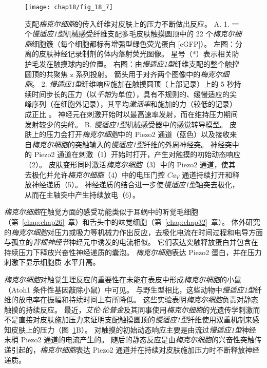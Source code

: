 \begin{figure}[htbp]
	\centering
	\texttt{[image: chap18/fig\_18\_7]}
	\caption{支配\textit{梅克尔细胞}的传入纤维对皮肤上的压力不断做出反应。
		A. 1. 一个\textit{慢适应1型}机械感受纤维支配多毛皮肤触摸圆顶中的 22 个\textit{梅克尔细胞}细胞簇（每个细胞都标有增强型绿色荧光蛋白 [eGFP]）。
		左图：分离的皮肤神经记录制剂的体内落射荧光图像。
		星号（*）表示相关防护毛发在触摸球内的位置。
		右图：由\textit{慢适应1型}纤维支配的整个触控圆顶的共聚焦 z 系列投射。
		箭头用于对齐两个图像中的\textit{梅克尔细胞}。
		2. \textit{慢适应1型}纤维响应施加在触摸圆顶（上部记录）上的 5 秒持续时间步长的压力（以\textit{千帕}为单位），具有不规则的、缓慢适应的尖峰序列（在细胞外记录），其平均\textit{激活率}和施加的力（较低的记录）成正比 。
		神经元在刺激开始时以最高速率发射，而在维持压力期间发射较少的尖峰。
		B. \textit{慢适应1型}机械感受器中的感觉转导模型。
		皮肤上的压力会打开\textit{梅克尔细胞}中的 Piezo2 通道（蓝色）以及接收来自\textit{梅克尔细胞}的突触输入的\textit{慢适应1型}纤维的外周神经突。
		神经突中的 Piezo2 通道在刺激（1）开始时打开，产生对触摸的初始动态响应（2）。
		皮肤变形同时激活\textit{梅克尔细胞}（3）中的 Piezo2 通道，使其去极化并允许\textit{梅克尔细胞}（4）中的电压门控 $Ca_V$ 通道持续打开和释放神经递质（5）。
		神经递质的结合进一步使\textit{慢适应1型}轴突去极化，从而在主轴突中产生持续放电（6）\cite{maksimovic2014epidermal}。}
	\label{fig:18_7}
\end{figure}


\textit{梅克尔细胞}在触觉方面的感受功能类似于耳蜗中的听觉毛细胞（第~\ref{chap:chap26}~章）和舌头中的味觉细胞（第~\ref{chap:chap32}~章）。
体外研究的\textit{梅克尔细胞}对压力或吸力等机械力作出反应，去极化电流在时间过程和电导方面与孤立的\textit{背根神经节}神经元中诱发的电流相似。
它们表达突触释放蛋白并包含在持续压力下释放兴奋性神经递质的囊泡。
\textit{梅克尔细胞}表达 Piezo2 蛋白，并在压力刺激下显示细胞质  水平升高。


\textit{梅克尔细胞}对触觉生理反应的重要性在未能在表皮中形成\textit{梅克尔细胞}的小鼠（Atoh1 条件性基因敲除小鼠）中可见。
与野生型相比，这些动物中\textit{慢适应1型}纤维的放电率在振幅和持续时间上有所降低。
这些实验表明\textit{梅克尔细胞}负责对静态触摸的持续反应。 
最近，\textit{艾伦$\cdot$伦普金}及其同事使用\textit{梅克尔细胞}的光遗传学刺激而不是直接对皮肤施加压力来证明支配触摸圆顶的\textit{慢适应1型}纤维使用双重机制来感知皮肤上的压力（图~\ref{fig:18_7}B）。
对触摸的初始动态响应主要是由流过\textit{慢适应1型}神经末梢 Piezo2 通道的电流产生的。
随后的静态反应是由\textit{梅克尔细胞}的兴奋性突触传递引起的，\textit{梅克尔细胞}表达 Piezo2 通道并在持续对皮肤施加压力时不断释放神经递质。


